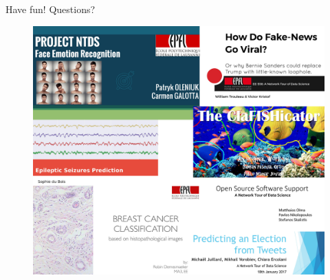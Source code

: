 \documentclass{beamer}
\begin{document}
\begin{frame}
	\Huge
	\begin{center}
		\vspace{0.2cm}
		Have fun! \hspace{1cm} Questions?
		\vspace{0.5cm}
		\begin{figure}
		\includegraphics[width=\linewidth]{projects_2016}
		\end{figure}
	\end{center}
\end{frame}
\end{document}
